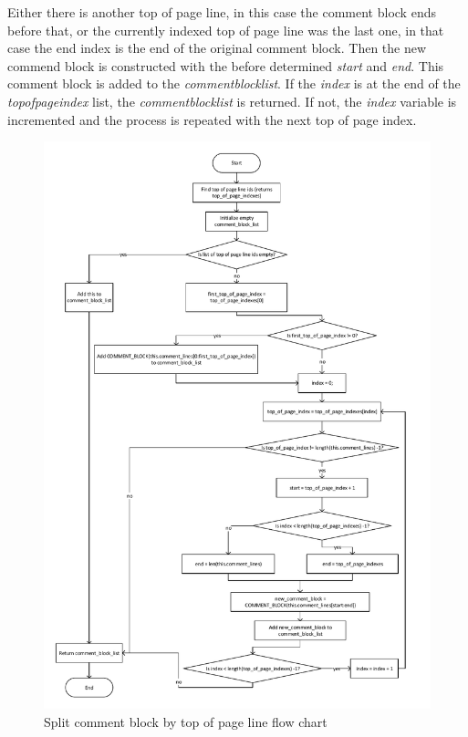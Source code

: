 Either there is another top of page line, in this case the comment block ends before that, or the currently indexed top of page line was the last one, in that case the end index is the end of the original comment block.
Then the new commend block is constructed with the before determined \textit{start} and \textit{end}.
This comment block is added to the \textit{comment\textunderscore block\textunderscore list}.
If the \textit{index} is at the end of the \textit{top\textunderscore of\textunderscore page\textunderscore index} list, the \textit{comment\textunderscore block\textunderscore list} is returned. If not, the \textit{index} variable is incremented and the process is repeated with the next top of page index.

\begin{figure}[H]
\centering
\includegraphics[width=1\textwidth]{images/Implementation_split_comment_by_top_of_page.pdf}
\caption{Split comment block by top of page line flow chart}
\label{fig:ImplementationMaintainingCommentSplitByTopOfPage}
\end{figure}


